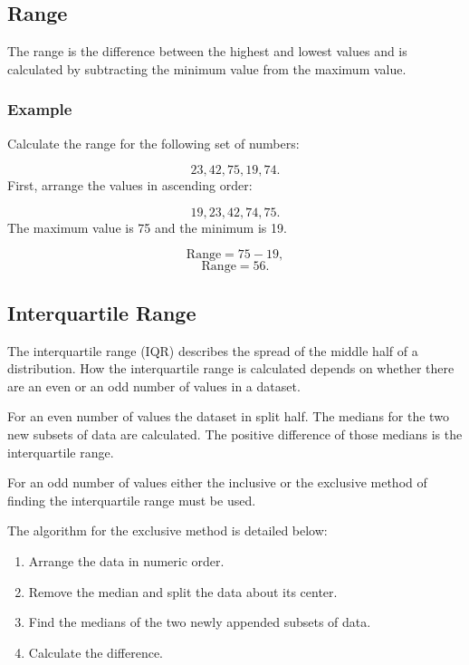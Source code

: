 \documentclass[
]{book}
\providecommand{\tightlist}{%
  \setlength{\itemsep}{0pt}\setlength{\parskip}{0pt}}
\begin{document}
\hypertarget{range}{%
\subsection{Range}\label{range}}

The range is the difference between the highest and lowest values and is calculated by subtracting the minimum value from the maximum value.

\hypertarget{example-7}{%
\subsubsection{Example}\label{example-7}}

Calculate the range for the following set of numbers:

\[ 23, 42, 75, 19, 74. \]
First, arrange the values in ascending order:

\[ 19, 23, 42, 74, 75. \]
The maximum value is 75 and the minimum is 19.

\[ \textrm{Range}= 75 - 19, \]
\[ \textrm{Range} = 56.\]

\hypertarget{iqr}{%
\subsection{Interquartile Range}\label{iqr}}

The interquartile range (IQR) describes the spread of the middle half of a distribution. How the interquartile range is calculated depends on whether there are an even or an odd number of values in a dataset.

For an even number of values the dataset in split half. The medians for the two new subsets of data are calculated. The positive difference of those medians is the interquartile range.

For an odd number of values either the inclusive or the exclusive method of finding the interquartile range must be used.

The algorithm for the exclusive method is detailed below:

\begin{enumerate}
\def\labelenumi{\arabic{enumi}.}
\tightlist
\item
  Arrange the data in numeric order.
\item
  Remove the median and split the data about its center.
\item
  Find the medians of the two newly appended subsets of data.
\item
  Calculate the difference.
\end{enumerate}
\end{document}

